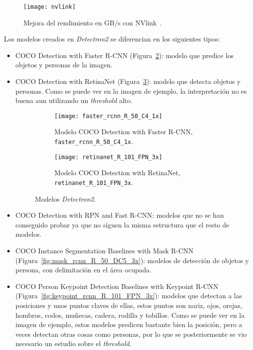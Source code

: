{\begin{figure}[h]
	\centering
	\texttt{[image: nvlink]}
	\caption{Mejora del rendimiento en GB/s con NVlink~\cite{nvlink}.}
	\label{fig:nvlink}
\end{figure}

Los modelos creados en \textit{Detectron2} se diferencian en los siguientes tipos:
\begin{itemize}
	\item COCO Detection with Faster R-CNN (Figura~\ref{fig:faster_rcnn_R_50_C4_1x}): modelo que predice los objetos y personas de la imagen.

	\item COCO Detection with RetinaNet (Figura~\ref{fig:retinanet_R_101_FPN_3x}): modelo que detecta objetos y personas. Como se puede ver en la imagen de ejemplo, la interpretación no es buena aun utilizando un \textit{threshold} alto.

	\begin{figure}[ht]
		\begin{subfigure}{.5\textwidth}
			\centering
			\texttt{[image: faster\_rcnn\_R\_50\_C4\_1x]}
			\caption{Modelo COCO Detection with Faster R-CNN, \texttt{faster\_rcnn\_R\_50\_C4\_1x}.}
			\label{fig:faster_rcnn_R_50_C4_1x}
		\end{subfigure}
		\begin{subfigure}{.5\textwidth}
			\centering
			\texttt{[image: retinanet\_R\_101\_FPN\_3x]}
			\caption{Modelo COCO Detection with RetinaNet, \texttt{retinanet\_R\_101\_FPN\_3x}.}
			\label{fig:retinanet_R_101_FPN_3x}
		\end{subfigure}
		\caption{Modelos \textit{Detectron2}.}
		\label{fig:m1}
	\end{figure}
	\item COCO Detection with RPN and Fast R-CNN: modelos que no se han conseguido probar ya que no siguen la misma estructura que el resto de modelos.
	\item COCO Instance Segmentation Baselines with Mask R-CNN (Figura~\ref{fig:mask_rcnn_R_50_DC5_3x}): modelos de detección de objetos y persona, con delimitación en el área ocupada.

	\item COCO Person Keypoint Detection Baselines with Keypoint R-CNN (Figura~\ref{fig:keypoint_rcnn_R_101_FPN_3x}): modelos que detectan a las posiciones y unos puntos claves de ellas, estos puntos son nariz, ojos, orejas, hombros, codos, muñecas, cadera, rodilla y tobillos. Como se puede ver en la imagen de ejemplo, estos modelos predicen bastante bien la posición, pero a veces detectan otras cosas como personas, por lo que se posteriormente se vio necesario un estudio sobre el \textit{threshold}.


\end{itemize}}
